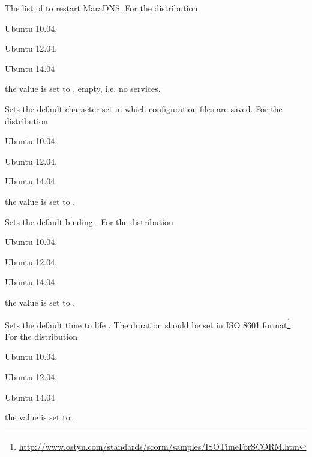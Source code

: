 The list of  to restart MaraDNS.
For the distribution
\begin{inparaitem}
\item[\TheDistribution{ubuntu}] Ubuntu 10.04,
\item[\TheDistribution{ubuntu}] Ubuntu 12.04,
\item[\TheDistribution{ubuntu}] Ubuntu 14.04
\end{inparaitem}
the value is set to \qcode{}, empty, i.e. no services.


Sets the default character set  in which configuration files are 
saved. For the distribution
\begin{inparaitem}
\item[\TheDistribution{ubuntu}] Ubuntu 10.04,
\item[\TheDistribution{ubuntu}] Ubuntu 12.04,
\item[\TheDistribution{ubuntu}] Ubuntu 14.04
\end{inparaitem}
the value is set to .


Sets the default binding . For the distribution
\begin{inparaitem}
\item[\TheDistribution{ubuntu}] Ubuntu 10.04,
\item[\TheDistribution{ubuntu}] Ubuntu 12.04,
\item[\TheDistribution{ubuntu}] Ubuntu 14.04
\end{inparaitem}
the value is set to .


Sets the default time to life . The duration should be set in 
ISO 8601 format\footnote{\url{http://www.ostyn.com/standards/scorm/samples/ISOTimeForSCORM.htm}}.
For the distribution
\begin{inparaitem}
\item[\TheDistribution{ubuntu}] Ubuntu 10.04,
\item[\TheDistribution{ubuntu}] Ubuntu 12.04,
\item[\TheDistribution{ubuntu}] Ubuntu 14.04
\end{inparaitem}
the value is set to .

